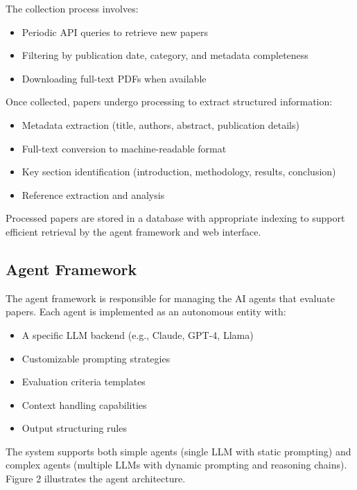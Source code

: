 \documentclass[conference]{IEEEtran}
\begin{document}
The collection process involves:
\begin{itemize}
    \item Periodic API queries to retrieve new papers
    \item Filtering by publication date, category, and metadata completeness
    \item Downloading full-text PDFs when available
\end{itemize}

Once collected, papers undergo processing to extract structured information:
\begin{itemize}
    \item Metadata extraction (title, authors, abstract, publication details)
    \item Full-text conversion to machine-readable format
    \item Key section identification (introduction, methodology, results, conclusion)
    \item Reference extraction and analysis
\end{itemize}

Processed papers are stored in a database with appropriate indexing to support efficient retrieval by the agent framework and web interface.

\subsection{Agent Framework}
The agent framework is responsible for managing the AI agents that evaluate papers. Each agent is implemented as an autonomous entity with:

\begin{itemize}
    \item A specific LLM backend (e.g., Claude, GPT-4, Llama)
    \item Customizable prompting strategies
    \item Evaluation criteria templates
    \item Context handling capabilities
    \item Output structuring rules
\end{itemize}

The system supports both simple agents (single LLM with static prompting) and complex agents (multiple LLMs with dynamic prompting and reasoning chains). Figure 2 illustrates the agent architecture.
\end{document}
